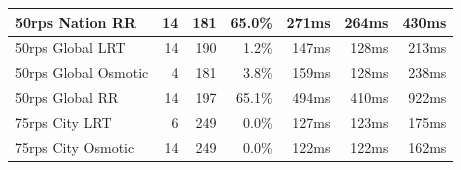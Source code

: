 \documentclass[draft,final]{vutinfth} %
\begin{document}
\begin{table}[]
\begin{tabular}{lrrrrrr}
50rps Nation RR      & 14                                                             & 181                                                                                       & 65.0\%                                                                        & 271ms                                                       & 264ms                                                         & 430ms                                                      \\ \hline
50rps Global LRT     & 14                                                             & 190                                                                                       & 1.2\%                                                                         & 147ms                                                       & 128ms                                                         & 213ms                                                      \\
50rps Global Osmotic & 4                                                              & 181                                                                                       & 3.8\%                                                                         & 159ms                                                       & 128ms                                                         & 238ms                                                      \\
50rps Global RR      & 14                                                             & 197                                                                                       & 65.1\%                                                                        & 494ms                                                       & 410ms                                                         & 922ms                                                      \\ \hline
75rps City LRT       & 6                                                              & 249                                                                                       & 0.0\%                                                                         & 127ms                                                       & 123ms                                                         & 175ms                                                      \\
75rps City Osmotic   & 14                                                             & 249                                                                                       & 0.0\%                                                                         & 122ms                                                       & 122ms                                                         & 162ms                                                      \\

\end{tabular}
\end{table}
\end{document}
